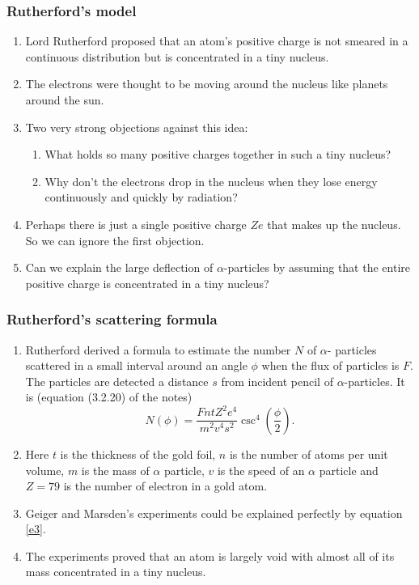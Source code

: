 \documentclass{beamer}
\begin{document}
\begin{frame}
\frametitle{Rutherford's model}
\begin{enumerate}
\item Lord Rutherford proposed that an atom's positive charge is not smeared
in a continuous distribution but is concentrated in a tiny nucleus.
\item The electrons were thought to be moving around the nucleus like planets
around the sun.
\item Two very strong objections against this idea:
\begin{enumerate}
\item What holds so many positive charges together in such a tiny nucleus? 
\item Why don't the electrons drop in the nucleus when they lose energy 
continuously and quickly by radiation?
\end{enumerate}
\item Perhaps there is just a single positive charge $Ze$ that makes up the 
nucleus. So we can ignore the first objection.
\item Can we explain the large deflection of $\alpha$-particles by assuming that
the entire positive charge is concentrated in a tiny nucleus?
\end{enumerate}
\end{frame}

\begin{frame}
\frametitle{Rutherford's scattering formula}
\begin{enumerate}
\item Rutherford derived a formula to estimate the number $N$ of $\alpha$-
particles scattered in a small interval around an angle $\phi$ when the flux
of particles is $F$. The particles are detected a distance $s$ from incident 
pencil of $\alpha$-particles. It is (equation (3.2.20) of the notes)
\begin{equation}\label{e3}
N(\phi) = \frac{FntZ^2e^4}{m^2v^4s^2}\csc^4\left(\frac{\phi}{2}\right).
\end{equation}
\item Here $t$ is the thickness of the gold foil, $n$ is the number of atoms
per unit volume, $m$ is the mass of $\alpha$ particle, $v$ is the speed of an
$\alpha$ particle and $Z = 79$ is the number of electron in a gold atom.
\item Geiger and Marsden's experiments could be explained perfectly by equation
\eqref{e3}.
\item The experiments proved that an atom is largely void with almost all of its
mass concentrated in a tiny nucleus.
\end{enumerate}
\end{frame}
\end{document}
